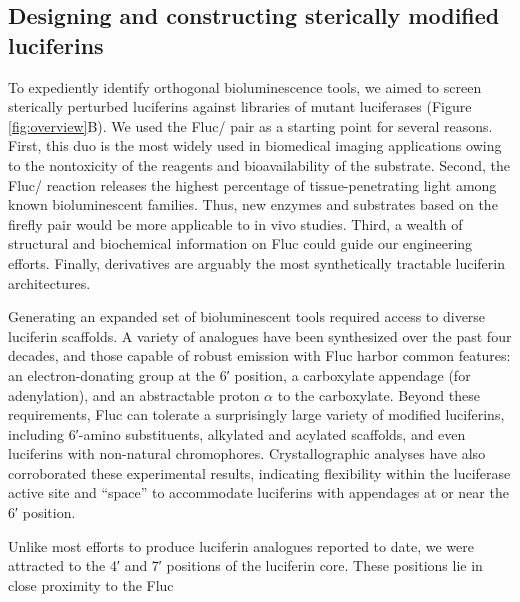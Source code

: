 \subsection*{Designing and constructing sterically modified luciferins}
To expediently identify orthogonal bioluminescence
tools, we aimed to screen sterically perturbed luciferins
against libraries of mutant luciferases (Figure \ref{fig:overview}B). We used the
Fluc/\dluciferin{} pair as a starting point for several reasons. First,
this duo is the most widely used in biomedical imaging
applications owing to the nontoxicity of the reagents and
bioavailability of the substrate.\cite{Berger:2008eq, Contag:1997kh} Second, the Fluc/\dluciferin{}
reaction releases the highest percentage of tissue-penetrating
light among known bioluminescent families.\cite{Zhao:2005if} Thus, new
enzymes and substrates based on the firefly pair would be more
applicable to in vivo studies. Third, a wealth of structural and
biochemical information on Fluc could guide our engineering
efforts.\cite{RN45, BRANCHINI:2001gr, Branchini:2003kt, RN107, RN86} Finally, \dluciferin{} derivatives are arguably the
most synthetically tractable luciferin architectures.\cite{Meroni:2009tu, RN172}
\par
Generating an expanded set of bioluminescent tools required
access to diverse luciferin scaffolds. A variety of \dluciferin{}
analogues have been synthesized over the past four
decades,\cite{RN14,RN165,RN112,White:1966gs,Woodroofe:2012vx,McCutcheon:2012ixb,RN100} and those capable of robust emission with
Fluc harbor common features: an electron-donating group at
the 6′ position, a carboxylate appendage (for adenylation), and
an abstractable proton $\alpha{}$ to the carboxylate.\cite{White:1966gs, Branchini:2015epa} Beyond these
requirements, Fluc can tolerate a surprisingly large variety of
modified luciferins,\cite{Meroni:2009ec, White:1966ig, SELIGER:1961dla} including 6′-amino substituents,\cite{RN98, Reddy:2010gaa, White:1966ig}
alkylated\cite{RN99, Wang:2017bc, RN31} and acylated\cite{Kuchimaru:2016eb} scaffolds, and even
luciferins with non-natural chromophores.\cite{Kuchimaru:2016eb, Jathoul:2014do} Crystallographic
analyses have also corroborated these experimental results,
indicating flexibility within the luciferase active site and “space”
to accommodate luciferins with appendages at or near the 6′
position.\cite{RN107, RN86}
\par
Unlike most efforts to produce luciferin analogues reported
to date, we were attracted to the 4′ and 7′ positions of the
luciferin core. These positions lie in close proximity to the Fluc
